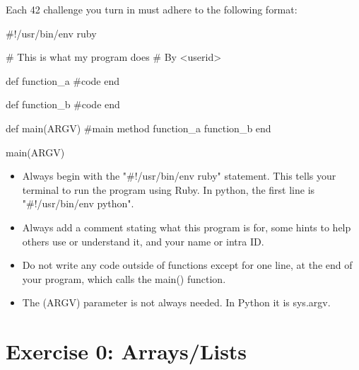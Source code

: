 \documentclass{42-en}
\begin{document}
Each 42 challenge you turn in must adhere to the following format:

\begin{42rbcode}
#!/usr/bin/env ruby

# This is what my program does
# By <userid>

def function_a
 #code
end

def function_b
 #code
end

def main(ARGV)
 #main method
 function_a
 function_b
end

main(ARGV)
\end{42rbcode}

\begin{itemize}
	\item Always begin with the "\#!/usr/bin/env ruby" statement. This tells your terminal to run the program using Ruby. In python, the first line is "\#!/usr/bin/env python".
	\item Always add a comment stating what this program is for, some hints to help others use or understand it, and your name or intra ID.
	\item Do not write any code outside of functions except for one line, at the end of your program, which calls the main() function.
	\item The (ARGV) parameter is not always needed. In Python it is sys.argv.
\end{itemize}


\startexercices


\chapter{Exercise 0: Arrays/Lists}

\makeheaderfiles
\end{document}
